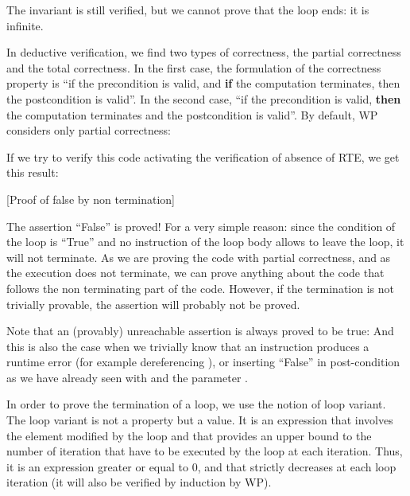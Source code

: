 The invariant is still verified, but we cannot prove that the loop ends:
it is infinite.





In deductive verification, we find two types of correctness, the partial
correctness and the total correctness. In the first case, the
formulation of the correctness property is ``if the precondition is
valid, and \textbf{if} the computation terminates, then the
postcondition is valid''. In the second case, ``if the precondition is
valid, \textbf{then} the computation terminates and the postcondition is
valid''. By default, WP considers only partial correctness:






If we try to verify this code activating the verification of absence of
RTE, we get this result:



[Proof of false by non termination]


The assertion ``False'' is proved! For a very simple reason: since the
condition of the loop is ``True'' and no instruction of the loop body
allows to leave the loop, it will not terminate. As we are proving the
code with partial correctness, and as the execution does not terminate,
we can prove anything about the code that follows the non terminating
part of the code. However, if the termination is not trivially provable,
the assertion will probably not be proved.



\begin{Information}
  Note that an (provably) unreachable assertion is always proved to be true:
  And this is also the case when we trivially know that an instruction
  produces a runtime error (for example dereferencing ), or
  inserting ``False'' in post-condition as we have already seen with
   and the parameter .
\end{Information}


In order to prove the termination of a loop, we use the notion of loop
variant. The loop variant is not a property but a value. It is an
expression that involves the element modified by the loop and that
provides an upper bound to the number of iteration that have to be
executed by the loop at each iteration. Thus, it is an expression
greater or equal to 0, and that strictly decreases at each loop
iteration (it will also be verified by induction by WP).


